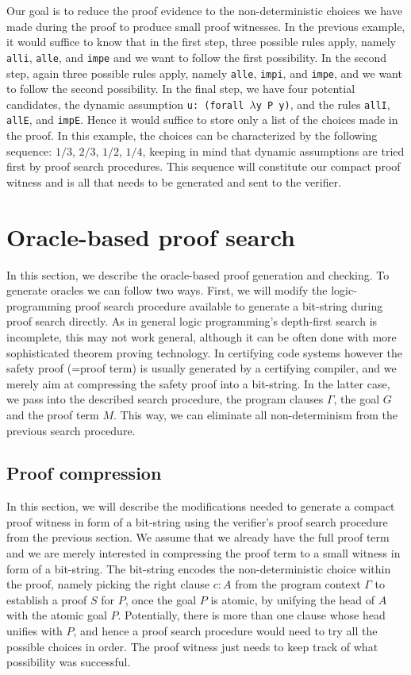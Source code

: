 \documentclass{acmconf}
\begin{document}
 Our goal is to reduce the proof evidence to the
non-deterministic choices we have made during the proof to produce
small proof witnesses. In the previous example, it would suffice to
know that in the first step, three possible rules apply, namely {\tt
  alli}, {\tt alle}, and {\tt impe} and we want to follow the first
possibility. In the second step, again three possible rules apply,
namely {\tt alle}, {\tt   impi}, and {\tt impe}, and we want to follow
the second possibility. In the final step, we have four potential
candidates, the dynamic assumption {\tt u: (forall $\lambda\!\!$y P
  y)}, and the rules {\tt allI}, {\tt allE}, and {\tt impE}.
 Hence it would suffice to store only a list of the choices made in
 the proof. In this example, the choices can be characterized by the
 following sequence: $1/3$, $2/3$, $1/2$, $1/4$, keeping in mind that
 dynamic assumptions are tried first by proof search procedures. This
 sequence will constitute our compact proof witness and is all that
 needs to be generated and sent to the verifier. 
      
\section{Oracle-based proof search}
\label{sec:oracles}

In this section, we describe the oracle-based proof generation and
checking. To generate oracles we can follow two ways. First, we will
modify the logic-programming proof search procedure available to generate
a bit-string during proof search directly. As in general logic
programming's depth-first search is incomplete, this may not work
general, although it can be often done with more sophisticated theorem
proving  technology. In certifying code systems however the safety
proof (=proof term) is usually generated by a certifying compiler, and
we merely aim at compressing the safety proof into a bit-string. In
the latter case, we pass into the described search procedure, the
program clauses $\Gamma$, the goal $G$ and the proof term $M$. This
way, we can eliminate all non-determinism from the previous search procedure.

\subsection{Proof compression}

In this section, we will describe the modifications needed to generate
a compact proof witness in form of a bit-string using the verifier's
proof search procedure from the previous section. We assume that we
already have the full proof term and we are merely interested in
compressing the proof term to a small witness in form of a bit-string.
The bit-string encodes the non-deterministic choice within the proof, namely picking
the right clause $c:A$ from the program context $\Gamma$ to establish a
proof $S$ for $P$, once the goal $P$ is atomic, by unifying the head
of $A$ with the atomic goal $P$. Potentially, there is more than one
clause whose head unifies with $P$, and hence a proof search procedure
would need to try all the possible choices in order. The proof witness
just needs to keep track of what possibility was successful.
\end{document}
